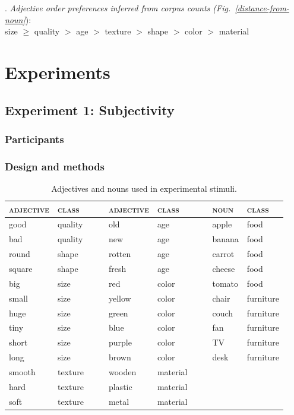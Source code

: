 \documentclass[11pt]{article}
\begin{document}
\ex. \label{inferred-order-preferences}
\emph{Adjective order preferences inferred from corpus counts (Fig.~\ref{distance-from-noun}}):\\
size $\geq$ quality $>$ age $>$ texture $>$ shape $>$ color $>$ material

\section{Experiments}


\subsection{Experiment 1: Subjectivity}

\subsubsection{Participants}

\subsubsection{Design and methods}


\begin{table}
	\centering
	\caption{Adjectives and nouns used in experimental stimuli.}\label{stim-table}
	\begin{tabular}{llccllc||cll}\hline
		\textsc{adjective} & \textsc{class} &&&\textsc{adjective} & \textsc{class} &&& \textsc{noun} & \textsc{class}\\\hline
		good	&	quality	&&&					old	&	age	&&&	apple	&	food	\\
		bad	&	quality	&&&					new	&	age	&&&	banana	&	food	\\
		round	&	shape	&&&					rotten	&	age	&&&	carrot	&	food	\\
		square	&	shape	&&&					fresh	&	age	&&&	cheese	&	food	\\
		big	&	size	&&&	red	&	color	&&&	tomato	&	food	\\
		small	&	size	&&&					yellow	&	color	&&&	chair	&	furniture	\\					
		huge	&	size	&&&					green	&	color	&&&	couch	&	furniture	\\
		tiny	&	size	&&&					blue	&	color	&&&	fan	&	furniture	\\					
		short	&	size	&&&					purple	&	color	&&&	TV	&	furniture	\\					
		long	&	size	&&&					brown	&	color	&&&	desk	&	furniture	\\					
		smooth	&	texture	&&&					wooden	&	material	&&&	\\								
		hard	&	texture	&&&					plastic	&	material	&&&		\\									
		soft	&	texture	&&&					metal	&	material	&&&		 
	\end{tabular}
\end{table}
\end{document}
